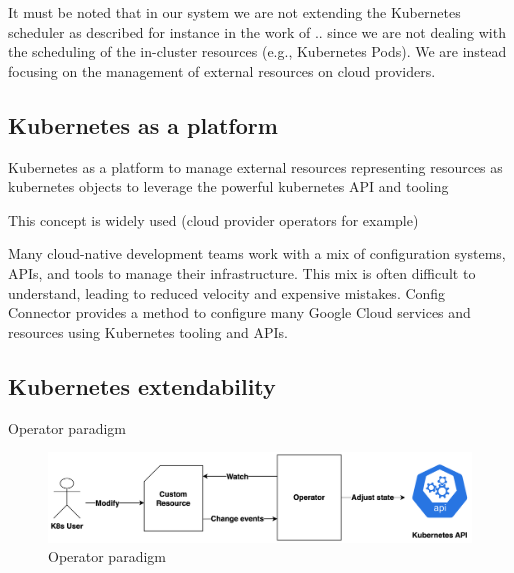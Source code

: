 It must be noted that in our system we are not extending the Kubernetes scheduler as described for instance in the work of ..
since we are not dealing with the scheduling of the in-cluster resources (e.g., Kubernetes Pods). 
We are instead focusing on the management of external resources on cloud providers.


\subsection{Kubernetes as a platform}

Kubernetes as a platform to manage external resources
representing resources as kubernetes objects to leverage the powerful kubernetes API and tooling

This concept is widely used 
(cloud provider operators for example)

Many cloud-native development teams work with a mix of configuration systems, APIs, and tools to manage their infrastructure. This mix is often difficult to understand, leading to reduced velocity and expensive mistakes. Config Connector provides a method to configure many Google Cloud services and resources using Kubernetes tooling and APIs.






\subsection{Kubernetes extendability}

Operator paradigm

\begin{figure}[H]
    \centering
    \includegraphics[width=1\linewidth]{images/opeartor_paradigm.png}
    \caption{Operator paradigm}
    \label{fig:operator_paradigm}
\end{figure}

